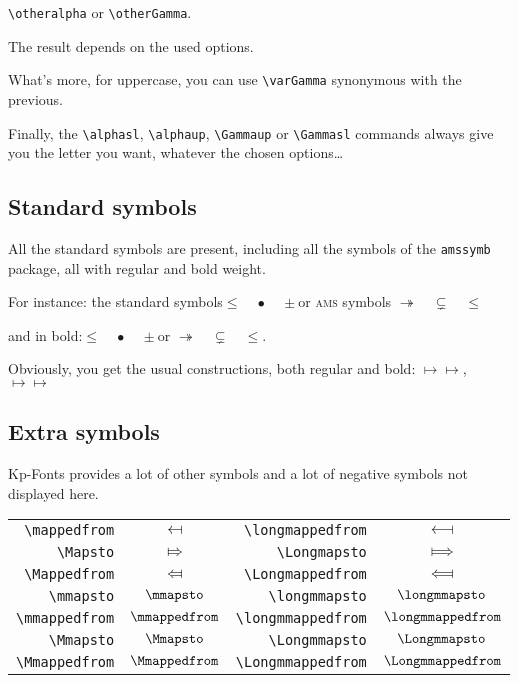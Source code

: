 \documentclass[a4paper,11pt]{christophe}
\begin{document}
\verb=\otheralpha= or \verb=\otherGamma=. 

The result depends on the used options.

What's more, for uppercase, you can use \verb=\varGamma= synonymous with the previous.

Finally, the \verb=\alphasl=, \verb=\alphaup=, \verb=\Gammaup= or \verb=\Gammasl= commands always give you the letter you want, whatever the chosen options\dots

\subsection{Standard symbols}

All the standard symbols are present, including all the symbols of the \texttt{amssymb} package, all with regular and bold weight.

For instance: the standard symbols\quad $\leq\quad\bullet\quad\pm$\quad or \textsc{ams} symbols \quad$\twoheadrightarrow\quad\subsetneq\quad\leqslant$

and in bold:\quad$\leq\quad\bullet\quad\pm$\quad or \quad$\twoheadrightarrow\quad\subsetneq\quad\leqslant$.

Obviously, you get the usual constructions, both regular and bold: \quad $\mapsto\longmapsto$,\quad
{}$\mapsto\longmapsto$

\subsection{Extra symbols}

Kp-Fonts provides a lot of other symbols and a lot of negative symbols not displayed here.


\begin{center}\begin{tabular}{r>{$}c<{$}|r>{$}c<{$}}

\verb=\mappedfrom=&\mappedfrom&\verb=\longmappedfrom=&\longmappedfrom\\
\verb=\Mapsto=&\Mapsto&\verb=\Longmapsto=&\Longmapsto\\
\verb=\Mappedfrom=&\Mappedfrom&\verb=\Longmappedfrom=&\Longmappedfrom\\
\verb=\mmapsto=&\mmapsto&\verb=\longmmapsto=&\longmmapsto\\
\verb=\mmappedfrom=&\mmappedfrom&\verb=\longmmappedfrom=&\longmmappedfrom\\
\verb=\Mmapsto=&\Mmapsto&\verb=\Longmmapsto=&\Longmmapsto\\
\verb=\Mmappedfrom=&\Mmappedfrom&\verb=\Longmmappedfrom=&\Longmmappedfrom\\

\end{tabular}\end{center}
\end{document}
